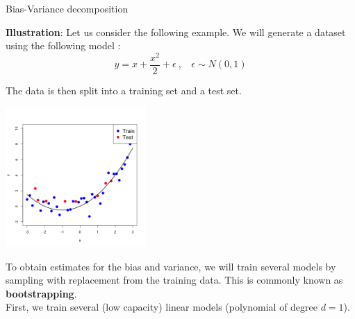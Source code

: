 \documentclass[11pt,compress,t,notes=noshow, xcolor=table]{beamer}
\begin{document}
\begin{vbframe} {Bias-Variance decomposition}






\framebreak

\textbf{Illustration}: Let us consider the following example. We will generate a dataset using the following model : 
$$y = x + \frac{x^2}{2} + \epsilon  \ , \ \ \ \ \epsilon \sim 
N (0, 1)$$

The data is then split into a training set and a test set.

\begin{center}
  \includegraphics[width = 0.4\textwidth]{figure/bias_variance_decomposition-train_test.png}
\end{center}

\framebreak

To obtain estimates for the bias and variance, we will train several models by sampling with replacement from the training data. This is commonly known as \textbf{bootstrapping}. \\
\vspace{0.3cm}
First, we train several (low capacity) linear models (polynomial of degree $d=1$).


\end{vbframe}
\end{document}
